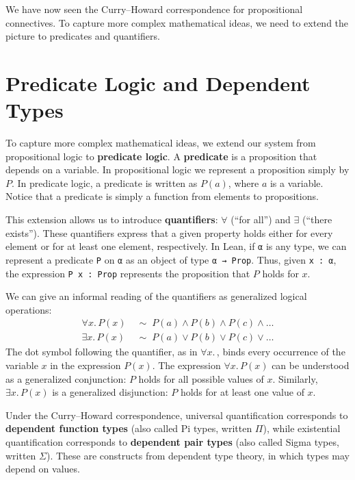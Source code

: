 We have now seen the Curry--Howard correspondence for propositional
connectives.
To capture more complex mathematical ideas, we need to extend the
picture to predicates and quantifiers.

\section{Predicate Logic and Dependent Types}\label{sec:predicate_logic}

To capture more complex mathematical ideas, we extend our system from
propositional logic to \textbf{predicate logic}.
A \textbf{predicate} is a proposition that depends on a variable.
In propositional logic we represent a proposition simply by $P$.
In predicate logic, a predicate is written as $P(a)$,
where $a$ is a variable.
Notice that a predicate is simply a
function from elements to propositions.

This extension allows us to introduce \textbf{quantifiers}:
$\forall$ (``for all'') and $\exists$ (``there exists'').
These quantifiers express that a given property holds either for
every element or for at least one element, respectively.
In Lean, if \lstinline[language=lean]|α| is any type, we can
represent a predicate \lstinline[language=lean]|P| on
\lstinline[language=lean]|α| as an object of type
\lstinline[language=lean]|α → Prop|.
Thus, given \lstinline[language=lean]|x : α|, the expression
\lstinline[language=lean]|P x : Prop| represents the proposition
that $P$ holds for $x$.

We can give an informal reading of the quantifiers as generalized
logical operations:
\begin{align*}
  \forall x.\,P(x) & \;\sim\; P(a) \land P(b) \land P(c) \land \ldots \\
  \exists x.\,P(x) & \;\sim\; P(a) \lor P(b) \lor P(c) \lor \ldots
\end{align*}
The dot symbol following the quantifier, as in $\forall x.\,$, binds
every occurrence of the variable $x$ in the expression $P(x)$.
The expression $\forall x.\, P(x)$ can be understood as a
generalized conjunction: $P$ holds for all possible values of $x$.
Similarly, $\exists x.\, P(x)$ is a generalized disjunction: $P$
holds for at least one value of $x$.

Under the Curry--Howard correspondence, universal quantification
corresponds to \textbf{dependent function types} (also called Pi
types, written $\Pi$), while existential quantification corresponds
to \textbf{dependent pair types} (also called Sigma types, written
$\Sigma$).
These are constructs from dependent type theory, in which types may
depend on values.

